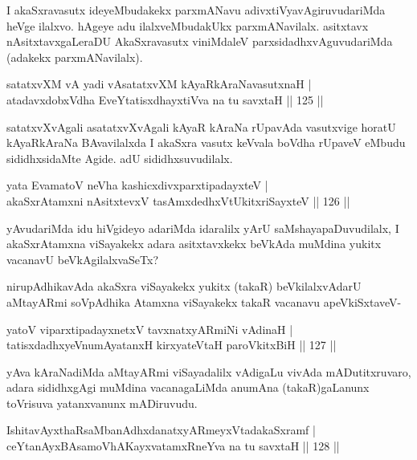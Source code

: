 \begin{artha}
I akaSxravasutx ideyeMbudakekx parxmANavu adivxtiVyavAgiruvudariMda heVge ilalxvo. hAgeye adu ilalxveMbudakUkx parxmANavilalx. asitxtavx nAsitxtavxgaLeraDU AkaSxravasutx viniMdaleV parxsidadhxvAguvudariMda (adakekx parxmANavilalx).
\end{artha}

\begin{shl}
satatxvXM vA yadi vA\s satatxvXM kAyaRkAraNavasutxnaH |\\
atadavxdobxVdha EveYtatisxdhayxtiVva na tu savxtaH \hfill || 125 ||
\end{shl}

\begin{artha}%
satatxvXvAgali asatatxvXvAgali kAyaR kAraNa rUpavAda vasutxvige horatU kAyaRkAraNa BAvavilalxda I akaSxra vasutx keVvala boVdha rUpaveV eMbudu sididhxsidaMte Agide. adU sididhxsuvudilalx.
\end{artha}


\begin{shl}
yata EvamatoV neVha kashicxdivxparxtipadayxteV |\\
akaSxrAtamxni nAsitxtevxV tasAmxdedhxVtUkitxriSayxteV \hfill || 126 ||
\end{shl}

\begin{artha}
yAvudariMda idu hiVgideyo adariMda idaralilx yArU saMshayapaDuvudilalx, I akaSxrAtamxna viSayakekx adara asitxtavxkekx beVkAda muMdina yukitx vacanavU beVkAgilalxvaSeTx?

nirupAdhikavAda akaSxra viSayakekx yukitx (takaR) beVkilalxvAdarU aMtayARmi soVpAdhika Atamxna viSayakekx takaR vacanavu apeVkiSxtaveV-
\end{artha}

\begin{shl}
yatoV viparxtipadayxnetxV tavxnatxyARmiNi vAdinaH |\\
tatisxdadhxyeV\s numAyatanxH kirxyateV\s taH paroVkitxBiH \hfill || 127 ||
\end{shl}

\begin{artha}
yAva kAraNadiMda aMtayARmi viSayadalilx vAdigaLu vivAda mADutitxruvaro, adara sididhxgAgi muMdina vacanagaLiMda anumAna (takaR)gaLanunx toVrisuva yatanxvanunx mADiruvudu.
\end{artha}

\begin{shl}
IshitavAyxthaRsaMbanAdhxdanatxyARmeyxVtadakaSxramf |\\
ceYtanAyxBAsamoVhAKayxvatamxRneYva na tu savxtaH \hfill || 128 ||
\end{shl}

